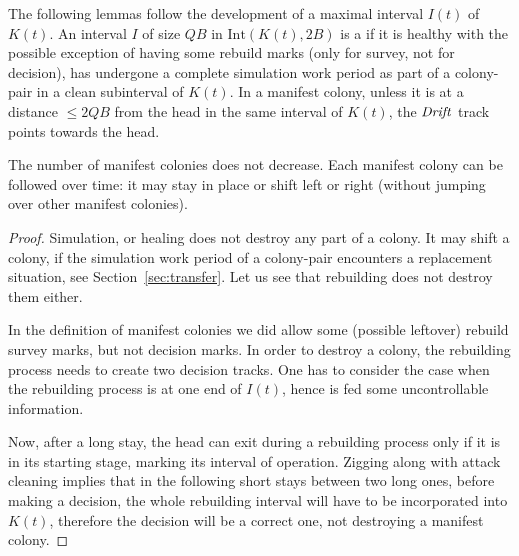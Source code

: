 \documentclass[11pt]{memoir}
\theoremstyle{definition} %
\renewcommand{\le}{\leq}
\newcommand{\fld}[1]{\ensuremath{\textit{#1\/}}}
\def\B{B}
\newcommand{\Int}{\mathrm{Int}} %
\newcommand{\Q}{Q} %
\newcommand{\Drift}{\fld{Drift}}
\begin{document}
The following lemmas
follow the development of a maximal interval \( I(t) \) of \( K(t) \).
An interval \( I \) of size \( \Q\B \) in \( \Int(K(t), 2\B) \) is a  if
it is healthy with the possible exception of having some rebuild marks (only for survey, not
for decision), has undergone a complete simulation work period as part of a colony-pair in a
clean subinterval of \( K(t) \).
In a manifest colony, 
unless it is at a distance \( \le 2\Q\B \) from the head in the same interval of \( K(t) \),
the \( \Drift \) track points towards the head.

\begin{lemma}\label{lem:escape.non-decr}
  The number of manifest colonies does not decrease.
  Each manifest colony can be followed over time: it may stay in place or
  shift left or right (without jumping over other manifest colonies).
\end{lemma}
\begin{proof}
  Simulation, or healing does not destroy any part of a colony.
  It may shift a colony, if the simulation work period of a colony-pair encounters a
  replacement situation, see Section~\ref{sec:transfer}.
  Let us see that rebuilding does not destroy them either.

  In the definition of manifest colonies we did allow some (possible leftover)
  rebuild survey marks, but not decision marks.
  In order to destroy a colony, the rebuilding process needs to create two decision tracks.
  One has to consider the case when the rebuilding process is at one end of \( I(t) \),
  hence is fed some uncontrollable information.

  Now, after a long stay, the head can exit during a rebuilding process only if it is in its starting
  stage, marking its interval of operation.
  Zigging along with attack cleaning
  implies that in the following short stays between two long ones,
  before making a decision, the whole
  rebuilding interval will have to be incorporated into \( K(t) \), therefore the decision will
  be a correct one, not destroying a manifest colony.
\end{proof}

\end{document}
